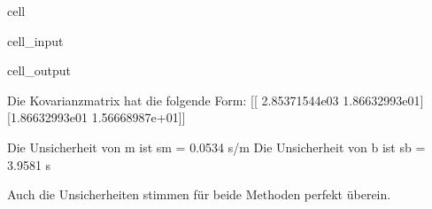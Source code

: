 \documentclass[letterpaper,10pt,english]{jupyterBook}
\begin{document}
\begin{sphinxuseclass}{cell}\begin{sphinxVerbatimInput}

\begin{sphinxuseclass}{cell_input}
\begin{sphinxVerbatim}[commandchars=\\\{\}]
 \PYG{p}{[}\PYG{p}{]}
 \PYG{p}{[}\PYG{p}{]}\PYG{p}{[}\PYG{p}{]}\PYG{p}{[}\PYG{p}{]}
 \PYG{p}{[}\PYG{p}{]}\PYG{p}{[}\PYG{p}{]}\PYG{p}{[}\PYG{p}{]}
\end{sphinxVerbatim}

\end{sphinxuseclass}\end{sphinxVerbatimInput}
\begin{sphinxVerbatimOutput}

\begin{sphinxuseclass}{cell_output}
\begin{sphinxVerbatim}[commandchars=\\\{\}]
Die Kovarianzmatrix hat die folgende Form: 
 [[ 2.85371544e\PYGZhy{}03 \PYGZhy{}1.86632993e\PYGZhy{}01]
 [\PYGZhy{}1.86632993e\PYGZhy{}01  1.56668987e+01]]

Die Unsicherheit von m ist 	 s\PYGZus{}m = 0.0534 s/m
Die Unsicherheit von b ist 	 s\PYGZus{}b = 3.9581 s
\end{sphinxVerbatim}

\end{sphinxuseclass}\end{sphinxVerbatimOutput}

\end{sphinxuseclass}
\sphinxAtStartPar
Auch die Unsicherheiten stimmen für beide Methoden perfekt überein.
\end{document}
